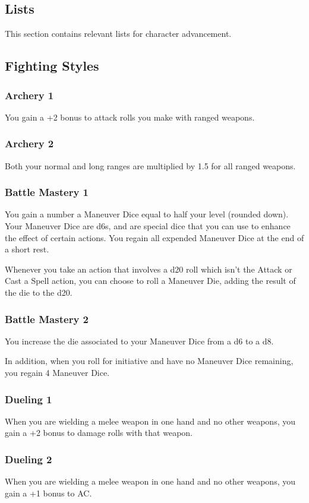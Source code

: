 \subsection*{Lists}
This section contains relevant lists for character advancement.

\subsection*{Fighting Styles} \label{ssec::fightingstyles}
    \subsubsection{Archery 1}
        You gain a +2 bonus to attack rolls you make with ranged weapons.
    \subsubsection{Archery 2}
        Both your normal and long ranges are multiplied by 1.5 for all ranged weapons.
    \subsubsection{Battle Mastery 1}
        You gain a number a Maneuver Dice equal to half your level (rounded down).
        Your Maneuver Dice are d6s, and are special dice that you can use to enhance the effect of certain actions.
        You regain all expended Maneuver Dice at the end of a short rest.

        Whenever you take an action that involves a d20 roll which isn't the Attack or Cast a Spell action, you can choose to roll a Maneuver Die, adding the result of the die to the d20.
    \subsubsection{Battle Mastery 2}
        You increase the die associated to your Maneuver Dice from a d6 to a d8.

        In addition, when you roll for initiative and have no Maneuver Dice remaining, you regain 4 Maneuver Dice.
    \subsubsection{Dueling 1}
        When you are wielding a melee weapon in one hand and no other weapons, you gain a +2 bonus to damage rolls with that weapon.
    \subsubsection{Dueling 2}
        When you are wielding a melee weapon in one hand and no other weapons, you gain a +1 bonus to AC.
